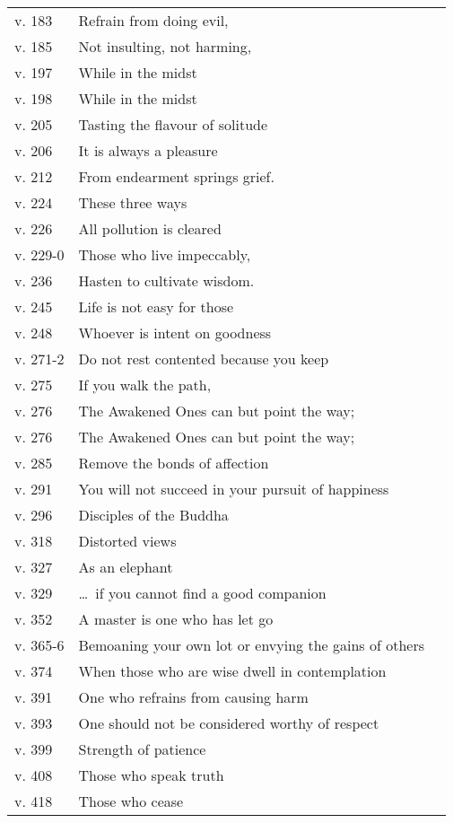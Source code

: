 {\begin{longtable}[c]{llr}
v. 183 & Refrain from doing evil, & \pageref{dhp-183}\\
v. 185 & Not insulting, not harming, & \pageref{dhp-185}\\
v. 197 & While in the midst & \pageref{dhp-197}\\
v. 198 & While in the midst & \pageref{dhp-198}\\
v. 205 & Tasting the flavour of solitude & \pageref{dhp-205}\\
v. 206 & It is always a pleasure & \pageref{dhp-206}\\
v. 212 & From endearment springs grief. & \pageref{dhp-212}\\
v. 224 & These three ways & \pageref{dhp-224}\\
v. 226 & All pollution is cleared & \pageref{dhp-226}\\
v. 229-0 & Those who live impeccably, & \pageref{dhp-229}\\
v. 236 & Hasten to cultivate wisdom. & \pageref{dhp-236}\\
v. 245 & Life is not easy for those & \pageref{dhp-245}\\
v. 248 & Whoever is intent on goodness & \pageref{dhp-248}\\
v. 271-2 & Do not rest contented because you keep & \pageref{dhp-271}\\
v. 275 & If you walk the path, & \pageref{dhp-275}\\
v. 276 & The Awakened Ones can but point the way; & \pageref{dhp-276}\\
v. 276 & The Awakened Ones can but point the way; & \pageref{dhp-276}\\
v. 285 & Remove the bonds of affection & \pageref{dhp-285}\\
v. 291 & You will not succeed in your pursuit of happiness & \pageref{dhp-291}\\
v. 296 & Disciples of the Buddha & \pageref{dhp-296}\\
v. 318 & Distorted views & \pageref{dhp-318}\\
v. 327 & As an elephant & \pageref{dhp-327}\\
v. 329 & \ldots\ if you cannot find a good companion & \pageref{dhp-329}\\
v. 352 & A master is one who has let go & \pageref{dhp-352}\\
v. 365-6 & Bemoaning your own lot or envying the gains of others & \pageref{dhp-365}\\
v. 374 & When those who are wise dwell in contemplation & \pageref{dhp-374}\\
v. 391 & One who refrains from causing harm & \pageref{dhp-391}\\
v. 393 & One should not be considered worthy of respect & \pageref{dhp-393}\\
v. 399 & Strength of patience & \pageref{dhp-399}\\
v. 408 & Those who speak truth & \pageref{dhp-408}\\
v. 418 & Those who cease & \pageref{dhp-418}\\
\end{longtable}

}


